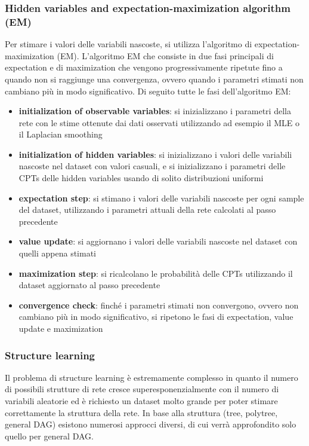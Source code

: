 \subsubsection*{Hidden variables and expectation-maximization algorithm (EM)}
Per stimare i valori delle variabili nascoste, si utilizza l'algoritmo di expectation-maximization (EM). L'algoritmo EM che
consiste in due fasi principali di expectation e di maximization che vengono progressivamente ripetute fino a quando non si
raggiunge una convergenza, ovvero quando i parametri stimati non cambiano più in modo significativo. Di seguito tutte le fasi
dell'algoritmo EM:
\begin{itemize}
	\item \textbf{initialization of observable variables}: si inizializzano i parametri della rete con le stime ottenute dai
	dati osservati utilizzando ad esempio il MLE o il Laplacian smoothing
	\item \textbf{initialization of hidden variables}: si inizializzano i valori delle variabili nascoste nel dataset con valori
	casuali, e si inizializzano i parametri delle CPTs delle hidden variables usando di solito distribuzioni uniformi
	\item \textbf{expectation step}: si stimano i valori delle variabili nascoste per ogni sample del dataset, utilizzando i
	parametri attuali della rete calcolati al passo precedente
	\item \textbf{value update}: si aggiornano i valori delle variabili nascoste nel dataset con quelli appena stimati
	\item \textbf{maximization step}: si ricalcolano le probabilità delle CPTs utilizzando il dataset aggiornato al passo precedente
	\item \textbf{convergence check}: finché i parametri stimati non convergono, ovvero non cambiano più in modo significativo,
	si ripetono le fasi di expectation, value update e maximization
\end{itemize}

\subsubsection*{Structure learning}
Il problema di structure learning è estremamente complesso in quanto il numero di possibili strutture di rete cresce
superesponenzialmente con il numero di variabili aleatorie ed è richiesto un dataset molto grande per poter stimare
correttamente la struttura della rete. In base alla struttura (tree, polytree, general DAG) esistono numerosi approcci
diversi, di cui verrà approfondito solo quello per general DAG.


